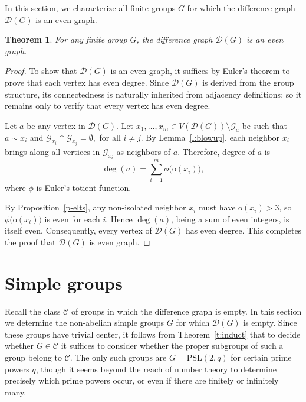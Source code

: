 \documentclass[12pt]{amsart}
\theoremstyle{plain}
\newtheorem{theorem}{Theorem}[section]
\theoremstyle{remark}
\theoremstyle{definition}
\begin{document}
In this section, we characterize all finite groups \(G\) for which the difference graph \(\mathcal{D}(G)\) is an even graph.

\begin{theorem}\label{t:euler}
For any finite group \(G\), the difference graph \(\mathcal{D}(G)\) is an even graph.
\end{theorem}

\begin{proof}
To show that \(\mathcal{D}(G)\) is an even graph, it suffices by Euler’s theorem to prove that each vertex has even degree. Since \(\mathcal{D}(G)\) is derived from the group structure, its connectedness is naturally inherited from adjacency definitions; so it remains only to verify that every vertex has even degree.

Let \(a\) be any vertex in \(\mathcal{D}(G)\).  Let $x_1, \dots, x_m\in  V(\mathcal{D}(G))\setminus\mathcal{G}_a$ be such that $a\sim x_i$ and $\mathcal{G}_{x_i}\cap \mathcal{G}_{x_j}=\emptyset,$ for all $i\neq j.$
By Lemma~\ref{l:blowup}, each neighbor \(x_i\) brings along all vertices in \(\mathcal{G}_{x_i}\) as neighbors of \(a\). Therefore, degree of \(a\) is
\[
\deg(a) = \sum_{i=1}^m \phi\bigl(\mathrm{o}(x_i)\bigr),
\]
where \(\phi\) is Euler’s totient function.

By Proposition~\ref{p-elts}, any non-isolated neighbor \(x_i\) must have \(\mathrm{o}(x_i) > 3\), so \(\phi\bigl(\mathrm{o}(x_i)\bigr)\) is even for each \(i\). Hence \(\deg(a)\), being a sum of even integers, is itself even.
Consequently, every vertex of \(\mathcal{D}(G)\) has even degree. This completes the proof that \(\mathcal{D}(G)\) is even graph.
\end{proof}




\section{Simple groups}
\label{sec:simple-grp}

Recall the class $\mathcal{C}$ of groups in which the difference graph is empty.
In this section we determine the non-abelian simple groups $G$ for which $\mathcal{D}(G)$ is empty. Since these groups
have trivial center, it follows from Theorem~\ref{t:induct} that to decide
whether $G\in\mathcal{C}$ it suffices to consider whether the proper subgroups
of such a group belong to $\mathcal{C}$. The only such groups are
$G=\mathrm{PSL}(2,q)$ for certain prime powers $q$, though it seems beyond the
reach of number theory to determine precisely which prime powers occur, or
even if there are finitely or infinitely many. 
\end{document}
